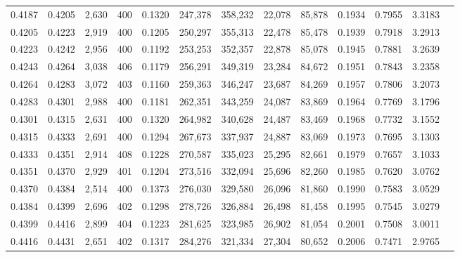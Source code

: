 \begin{tabular}{rrrrrrrrrrrrr}
0.4187 & 0.4205 &  2,630 & 400 &                                     0.1320 & 247,378 & 358,232 &  22,078 &  85,878 & 0.1934 & 0.7955 & 3.3183 \\
0.4205 & 0.4223 &  2,919 & 400 &                                     0.1205 & 250,297 & 355,313 &  22,478 &  85,478 & 0.1939 & 0.7918 & 3.2913 \\
0.4223 & 0.4242 &  2,956 & 400 &                                     0.1192 & 253,253 & 352,357 &  22,878 &  85,078 & 0.1945 & 0.7881 & 3.2639 \\
0.4243 & 0.4264 &  3,038 & 406 &                                     0.1179 & 256,291 & 349,319 &  23,284 &  84,672 & 0.1951 & 0.7843 & 3.2358 \\
0.4264 & 0.4283 &  3,072 & 403 &                                     0.1160 & 259,363 & 346,247 &  23,687 &  84,269 & 0.1957 & 0.7806 & 3.2073 \\
0.4283 & 0.4301 &  2,988 & 400 &                                     0.1181 & 262,351 & 343,259 &  24,087 &  83,869 & 0.1964 & 0.7769 & 3.1796 \\
0.4301 & 0.4315 &  2,631 & 400 &                                     0.1320 & 264,982 & 340,628 &  24,487 &  83,469 & 0.1968 & 0.7732 & 3.1552 \\
0.4315 & 0.4333 &  2,691 & 400 &                                     0.1294 & 267,673 & 337,937 &  24,887 &  83,069 & 0.1973 & 0.7695 & 3.1303 \\
0.4333 & 0.4351 &  2,914 & 408 &                                     0.1228 & 270,587 & 335,023 &  25,295 &  82,661 & 0.1979 & 0.7657 & 3.1033 \\
0.4351 & 0.4370 &  2,929 & 401 &                                     0.1204 & 273,516 & 332,094 &  25,696 &  82,260 & 0.1985 & 0.7620 & 3.0762 \\
0.4370 & 0.4384 &  2,514 & 400 &                                     0.1373 & 276,030 & 329,580 &  26,096 &  81,860 & 0.1990 & 0.7583 & 3.0529 \\
0.4384 & 0.4399 &  2,696 & 402 &                                     0.1298 & 278,726 & 326,884 &  26,498 &  81,458 & 0.1995 & 0.7545 & 3.0279 \\
0.4399 & 0.4416 &  2,899 & 404 &                                     0.1223 & 281,625 & 323,985 &  26,902 &  81,054 & 0.2001 & 0.7508 & 3.0011 \\
0.4416 & 0.4431 &  2,651 & 402 &                                     0.1317 & 284,276 & 321,334 &  27,304 &  80,652 & 0.2006 & 0.7471 & 2.9765 \\

\end{tabular}
